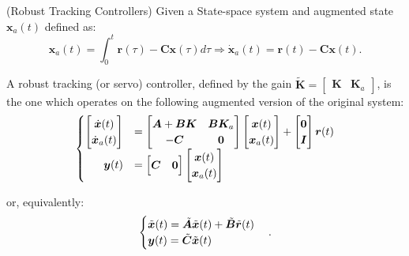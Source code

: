 \documentclass[a4paper,11pt]{book}
\numberwithin{figure}{chapter}
\numberwithin{equation}{chapter}
\numberwithin{table}{chapter}
\theoremstyle{definition}
\newtheorem{definition}{Definition}[chapter]
\newcounter{boxed-theorem}
\newcounter{boxed-definition}
\newenvironment{boxed-definition}[1]
{\begin{shaded} \begin{definition}{#1}}
{\end{definition} \end{shaded}}
\begin{document}
\begin{boxed-definition}{(Robust Tracking Controllers)} \label{def:robustTracking}
    Given a State-space system and augmented state $\bm{x}_a(t)$ defined as:
    \begin{equation}
        \bm{x}_a(t) = \int_{0}^{t} \bm{r}(\tau) - \bm{C} \bm{x}(\tau) d\tau \Longrightarrow \dot{\bm{x}}_a(t) = \bm{r}(t) - \bm{C} \bm{x}(t)
    .\end{equation}
    
    A robust tracking (or servo) controller, defined by the gain $\tilde{\bm{K}} = \begin{bmatrix} \bm{K} & \bm{K}_a \end{bmatrix}$, is the one which operates on the following augmented version of the original system:
    \begin{align} \label{eq:augmentedSystem}
    \begin{cases}
        \begin{bmatrix}
            \dot{\bm{x}}(t) \\
            \dot{\bm{x}}_a(t)
        \end{bmatrix} &= \begin{bmatrix}
            \bm{A} + \bm{B} \bm{K} & \bm{B} \bm{K}_a \\ - \bm{C} & \bm{0}
        \end{bmatrix} \begin{bmatrix}
            \bm{x}(t) \\
            \bm{x}_a(t)
        \end{bmatrix} + \begin{bmatrix}
            \bm{0} \\
            \bm{I}
        \end{bmatrix} \bm{r}(t)
        \\
        \hfill \bm{y}(t) &= \begin{bmatrix}
            \bm{C} & \bm{0}
        \end{bmatrix} \begin{bmatrix}
            \bm{x}(t) \\
            \bm{x}_a(t)
        \end{bmatrix}
    \end{cases}
    \end{align}
    
    or, equivalently:
    \begin{align}
    \begin{cases}
        \tilde{\bm{x}}(t) = \tilde{\bm{A}} \tilde{\bm{x}}(t) + \tilde{\bm{B}} \tilde{\bm{r}}(t) \\
        \bm{y}(t) = \tilde{\bm{C}} \tilde{\bm{x}}(t) \hfill
    \end{cases}
    .\end{align}
\end{boxed-definition}
\end{document}
